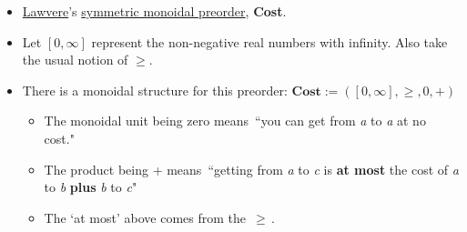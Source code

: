 \begin{itemize}
    \item \hyperref[D2.53]{Lawvere}'s \hyperref[D2.2]{symmetric monoidal preorder}, \textbf{Cost}.
    \item Let $[0,\infty]$ represent the non-negative real numbers with infinity. Also take the usual notion of $\geq$.
    \item There is a monoidal structure for this preorder: $\mathbf{Cost}:=([0,\infty],\geq,0,+)$
          \begin{itemize}
            \item The monoidal unit being zero means \,``you can get from \emph{a} to \emph{a} at no cost."\,
            \item The product being + means \,``getting from \emph{a} to \emph{c} is \textbf{at most} the cost of \emph{a} to \emph{b} \textbf{plus} \emph{b} to \emph{c}"\,
            \item The `at most' above comes from the \,$\geq$\,.   \end{itemize}
  \end{itemize}
